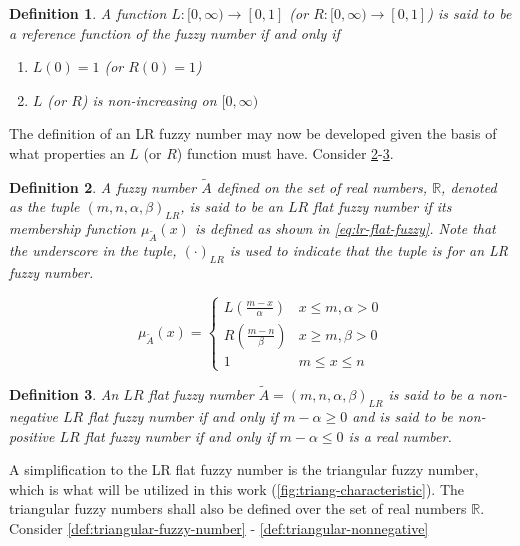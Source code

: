 \documentclass[ee,thesis]{usuthesis}
\newtheorem{definition}{Definition}[section]
\begin{document}
\begin{definition}
\label{def:reference-function}
A function \(L:[0,\infty) \rightarrow [0,1]\) (or \(R:[0,\infty) \rightarrow [0,1]\)) is said to be a reference function of the fuzzy number if and only
if

\begin{enumerate}
\item \(L(0) = 1\) (or \(R(0) = 1\))
\item \(L\) (or \(R\)) is non-increasing on \([0,\infty)\)
\end{enumerate}
\end{definition}

The definition of an LR fuzzy number may now be developed given the basis of what properties an \(L\) (or \(R\)) function
must have. Consider \ref{def:lr-flat}-\ref{def:lr-non-negative}.

\begin{definition}
\label{def:lr-flat} A fuzzy number \(\tilde{A}\) defined on the set of real numbers, \(\mathbb{R}\), denoted as the tuple
\((m,n,\alpha,\beta)_{LR}\), is said to be an \(LR\) flat fuzzy number if its membership function \(\mu_{\tilde{A}}(x)\) is defined as
shown in \ref{eq:lr-flat-fuzzy}. Note that the underscore in the tuple, \((\cdot)_{LR}\) is used to indicate that the tuple is for
an LR fuzzy number.

\begin{equation}
\label{eq:lr-flat-fuzzy}
\mu_{\tilde{A}}(x) =
\begin{cases}
L(\frac{m-x}{\alpha}) & x \le m, \alpha > 0 \\
R(\frac{m-n}{\beta}) & x \ge m, \beta > 0 \\
1                & m \le x \le n
\end{cases}
\end{equation}
\end{definition}

\begin{definition}
\label{def:lr-non-negative}
An \(LR\) flat fuzzy number \(\tilde{A} = (m,n,\alpha,\beta)_{LR}\) is said to be a non-negative \(LR\) flat fuzzy number if and only
if \(m-\alpha \ge 0\) and is said to be non-positive \(LR\) flat fuzzy number if and only if \(m - \alpha \le 0\) is a real number.
\end{definition}

A simplification to the LR flat fuzzy number is the triangular fuzzy number, which is what will be utilized in this work
(\ref{fig:triang-characteristic}). The triangular fuzzy numbers shall also be defined over the set of real numbers \(\mathbb{R}\). Consider
\ref{def:triangular-fuzzy-number} - \ref{def:triangular-nonnegative}
\end{document}

